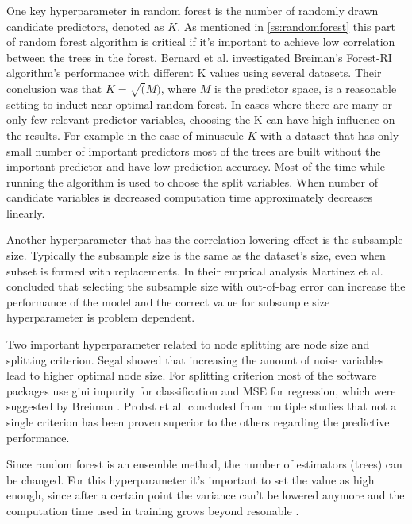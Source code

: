 One key hyperparameter in random forest is the number of randomly drawn candidate predictors, denoted as $K$. As mentioned in \ref{ss:randomforest} this part of random forest algorithm is critical if it's important to achieve low correlation between the trees in the forest. Bernard et al. \cite{bernard2009influence} investigated Breiman's Forest-RI algorithm's performance with different K values using several datasets. Their conclusion was that $K=\sqrt(M)$, where $M$ is the predictor space, is a reasonable setting to induct near-optimal random forest. In cases where there are many or only few relevant predictor variables, choosing the K can have high influence on the results. For example in the case of minuscule $K$ with a dataset that has only small number of important predictors most of the trees are built without the important predictor and have low prediction accuracy. \cite{bernard2009influence} Most of the time while running the algorithm is used to choose the split variables. When number of candidate variables is decreased computation time approximately decreases linearly. \cite{wright2017unbiased}

Another hyperparameter that has the correlation lowering effect is the subsample size. Typically the subsample size is the same as the dataset's size, even when subset is formed with replacements. In their emprical analysis Martinez et al. \cite{martinez2010out} concluded that selecting the subsample size with out-of-bag error can increase the performance of the model and the correct value for subsample size hyperparameter is problem dependent.

Two important hyperparameter related to node splitting are node size and splitting criterion. Segal \cite{segal2004machine} showed that increasing the amount of noise variables lead to higher optimal node size. For splitting criterion most of the software packages use gini impurity for classification and MSE for regression, which were suggested by Breiman \cite{breiman2001random}. Probst et al. \cite{probst2018hyperparameters} concluded from multiple studies that not a single criterion has been proven superior to the others regarding the predictive performance.

Since random forest is an ensemble method, the number of estimators (trees) can be changed. For this hyperparameter it's important to set the value as high enough, since after a certain point the variance can't be lowered anymore and the computation time used in training grows beyond resonable \cite{probst2018hyperparameters}.

